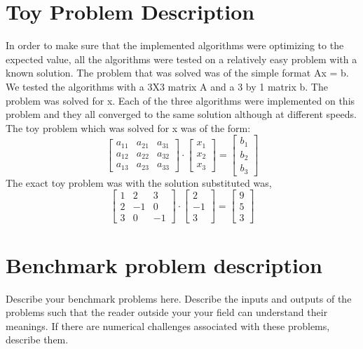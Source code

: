 \documentclass[10pt,twocolumn]{article}
\begin{document}
\section{Toy Problem Description}
In order to make sure that the implemented algorithms were optimizing to the expected value, all the  algorithms were tested on a relatively easy problem with a known solution. The problem that was solved was of the simple format Ax = b. We tested the algorithms with a 3X3 matrix A and a 3 by 1 matrix b. The problem was solved for x. Each of the three algorithms were implemented on this problem and they all converged to the same solution although at different speeds. The toy problem which was solved for x was of the form:
$$
\quad
\begin{bmatrix} 
a_{11} & a_{21} & a_{31}\\
a_{12} & a_{22} & a_{32} \\
a_{13} & a_{23} & a_{33} 
\end{bmatrix} \cdot
\begin{bmatrix}
x_{1}\\
x_{2}\\
x_{3} 
\end{bmatrix} = \begin{bmatrix}
b_{1}\\
b_{2}\\
b_{3} 
\end{bmatrix} 
\quad
$$
The exact toy problem was with the solution substituted was, 
$$
\quad
\begin{bmatrix} 
1& 2 & 3\\
2 & -1 & 0\\
3 & 0 & -1
\end{bmatrix} \cdot
\begin{bmatrix}
2\\
-1\\
3 
\end{bmatrix} = \begin{bmatrix}
9\\
5\\
3 
\end{bmatrix} 
\quad
$$

\section{Benchmark problem description}
Describe your benchmark problems here. Describe the inputs and outputs of the problems such that the reader outside your your field can understand their meanings. If there are numerical challenges associated with these problems, describe them.
\end{document}
